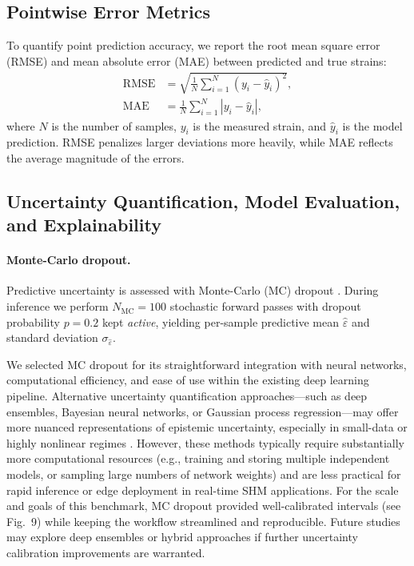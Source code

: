 \documentclass{article}
\begin{document}
\subsection{Pointwise Error Metrics}
\label{sec:error-metrics}

To quantify point prediction accuracy, we report the root mean square error (RMSE) and mean absolute error (MAE) between predicted and true strains:
\begin{align}
\label{eq:rmse}
\mathrm{RMSE} &= \sqrt{\frac{1}{N} \sum_{i=1}^N \left( y_i - \hat{y}_i \right)^2}, \\
\label{eq:mae}
\mathrm{MAE}  &= \frac{1}{N} \sum_{i=1}^N \left| y_i - \hat{y}_i \right|,
\end{align}
where $N$ is the number of samples, $y_i$ is the measured strain, and $\hat{y}_i$ is the model prediction. RMSE penalizes larger deviations more heavily, while MAE reflects the average magnitude of the errors.

\subsection{Uncertainty Quantification, Model Evaluation, and Explainability}
\label{sec:uq_eval}

\paragraph{Monte-Carlo dropout.}
Predictive uncertainty is assessed with Monte-Carlo (MC) dropout \citep{gal2016dropout}.
During inference we perform $N_{\mathrm{MC}}=100$ stochastic forward passes
with dropout probability $p=0.2$ kept \emph{active},
yielding per-sample predictive mean $\hat\varepsilon$ and standard deviation
$\sigma_{\hat\varepsilon}$. 

We selected MC dropout for its straightforward integration with neural networks, computational efficiency, and ease of use within the existing deep learning pipeline. Alternative uncertainty quantification approaches—such as deep ensembles, Bayesian neural networks, or Gaussian process regression—may offer more nuanced representations of epistemic uncertainty, especially in small-data or highly nonlinear regimes \citep{ghosh2023fatigue}. However, these methods typically require substantially more computational resources (e.g., training and storing multiple independent models, or sampling large numbers of network weights) and are less practical for rapid inference or edge deployment in real-time SHM applications. For the scale and goals of this benchmark, MC dropout provided well-calibrated intervals (see Fig.~9) while keeping the workflow streamlined and reproducible. Future studies may explore deep ensembles or hybrid approaches if further uncertainty calibration improvements are warranted.
\end{document}
